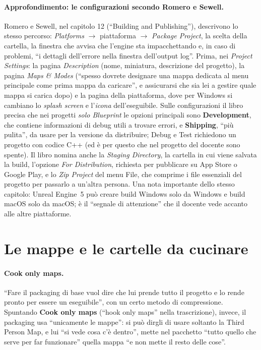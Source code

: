 \paragraph{Approfondimento: le configurazioni secondo Romero e Sewell.} Romero e Sewell, nel
capitolo 12 (``Building and Publishing''), descrivono lo stesso percorso: \emph{Platforms}
$\rightarrow$ piattaforma $\rightarrow$ \emph{Package Project}, la scelta della cartella, la
finestra che avvisa che l'engine sta impacchettando e, in caso di problemi, ``i dettagli
dell'errore nella finestra dell'output log''. Prima, nei \emph{Project Settings}: la pagina
\emph{Description} (nome, miniatura, descrizione del progetto), la pagina \emph{Maps \& Modes}
(``spesso dovrete designare una mappa dedicata al menu principale come prima mappa da
caricare'', e assicurarsi che sia lei a gestire quale mappa si carica dopo) e la pagina della
piattaforma, dove per Windows si cambiano lo \emph{splash screen} e l'\emph{icona}
dell'eseguibile. Sulle configurazioni il libro precisa che nei progetti \emph{solo
Blueprint} le opzioni principali sono \textbf{Development}, che contiene informazioni di debug
utili a trovare errori, e \textbf{Shipping}, ``più pulita'', da usare per la versione da
distribuire; Debug e Test richiedono un progetto con codice C++ (ed è per questo che nel
progetto del docente sono spente). Il libro nomina anche la \emph{Staging Directory}, la
cartella in cui viene salvata la build, l'opzione \emph{For Distribution}, richiesta per
pubblicare su App Store o Google Play, e lo \emph{Zip Project} del menu File, che comprime i
file essenziali del progetto per passarlo a un'altra persona. Una nota importante dello stesso
capitolo: Unreal Engine~5 può creare build Windows solo da Windows e build macOS solo da macOS;
è il ``segnale di attenzione'' che il docente vede accanto alle altre piattaforme.

\section{Le mappe e le cartelle da cucinare}
\label{ue16:sec:cook}

\paragraph{Cook only maps.} ``Fare il packaging di base vuol dire che lui prende tutto il
progetto e lo rende pronto per essere un eseguibile'', con un certo metodo di compressione.
Spuntando \textbf{Cook only maps} (``hook only maps'' nella trascrizione), invece, il
packaging usa ``unicamente le mappe'': si può dirgli di usare soltanto la Third Person Map, e
lui ``si vede cosa c'è dentro'', mette nel pacchetto ``tutto quello che serve per far funzionare''
quella mappa ``e non mette il resto delle cose''.

